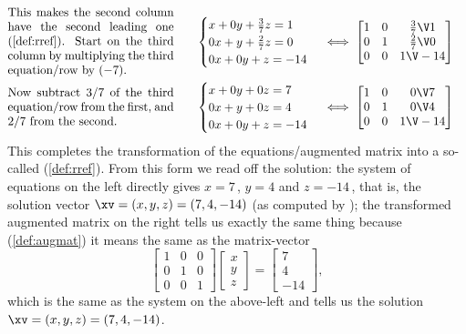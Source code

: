 \begin{example}
\begin{solution}
\begin{align*}
\\[0ex plus 1ex]&
\parbox{0.4\linewidth}{This makes the second column have the second leading one (\cref{def:rref}).  
Start on the third column by multiplying the third equation\slash row by~\((-7)\).}
\quad&
\begin{cases}
x+0y+\frac37z=1\\ 0x+y+\frac27z=0\\ 0x+0y+z=-14
\end{cases}
&\iff %
\begin{bmatrix} 1&0&\frac37\V1\\0&1&\frac27\V0\\0&0&1\V-14 \end{bmatrix}
\\[0ex plus 1ex]&
\parbox{0.4\linewidth}{Now subtract \(3/7\)~of the third equation\slash row from the first, and \(2/7\) from the second.}
\quad&
\begin{cases}
x+0y+0z=7\\ 0x+y+0z=4\\ 0x+0y+z=-14
\end{cases}
&\iff %
\begin{bmatrix} 1&0&0\V7\\0&1&0\V4\\0&0&1\V-14 \end{bmatrix}
\end{align*}
This completes the transformation of the equations\slash augmented matrix into a so-called  (\cref{def:rref}).
From this form we read off the solution:  the system of equations on the left directly gives \(x=7\)\,, \(y=4\) and \(z=-14\)\,, that is, the solution vector \(\xv=(x,y,z)=(7,4,-14)\) (as computed by \script);
the transformed augmented matrix on the right tells us exactly the same thing because (\cref{def:augmat}) it means the same as the matrix-vector 
\begin{equation*}
\begin{bmatrix} 1&0&0\\0&1&0\\0&0&1 \end{bmatrix}
\begin{bmatrix} x\\y\\z \end{bmatrix}
=\begin{bmatrix} 7\\4\\-14 \end{bmatrix},
\end{equation*}
which is the same as the system on the above-left and tells us the solution \(\xv=(x,y,z)=(7,4,-14)\).
\end{solution}
\end{example}





